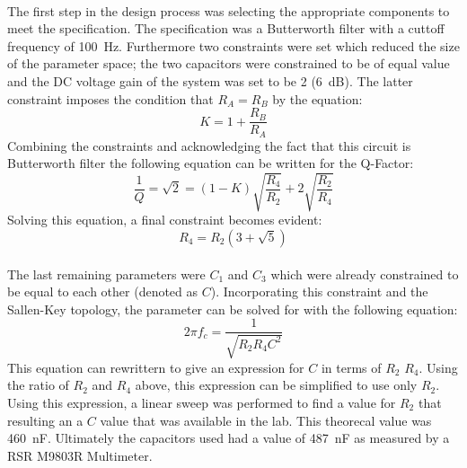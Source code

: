 \documentclass[justified]{tufte-handout}
\begin{document}
\paragraph{} The first step in the design process was selecting the appropriate
components to meet the specification. The specification was a Butterworth filter with a cuttoff frequency of 100~Hz. Furthermore two
constraints were set which reduced the size of the parameter space; the two
capacitors were constrained to be of equal value and the DC voltage gain of the
system was set to be 2 (6~dB). The latter constraint imposes the condition that
$R_A = R_B$ by the equation:
\begin{equation}
K = 1 + \frac{R_B}{R_A}
\end{equation}
Combining the constraints and acknowledging the fact that this circuit is
Butterworth filter the following equation can be written for the Q-Factor:
\begin{equation}
\frac{1}{Q} = \sqrt{2} = (1-K)\sqrt{\frac{R_4}{R_2}} + 2\sqrt{\frac{R_2}{R_4}}
\end{equation}
Solving this equation, a final constraint becomes evident:
\begin{equation}
R_4 = R_2(3+\sqrt{5})
\end{equation}
\paragraph{} The last remaining parameters were $C_1$ and $C_3$ which were
already constrained to be equal to each other (denoted as $C$). Incorporating
this constraint and the Sallen-Key topology, the parameter can be solved for
with the following equation:
\begin{equation}
2\pi f_c = \frac{1}{\sqrt{R_2R_4C^2}}
\end{equation}
This equation can rewrittern to give an expression for $C$ in terms of $R_2$
$R_4$. Using the ratio of $R_2$ and $R_4$ above, this expression can be
simplified to use only $R_2$. Using this expression, a linear sweep was
performed to find a value for $R_2$ that resulting an a $C$ value that was
available in the lab. This theorecal value was 460~nF. Ultimately the
capacitors used had a value of 487~nF as measured by a RSR M9803R
Multimeter. 
\end{document}
